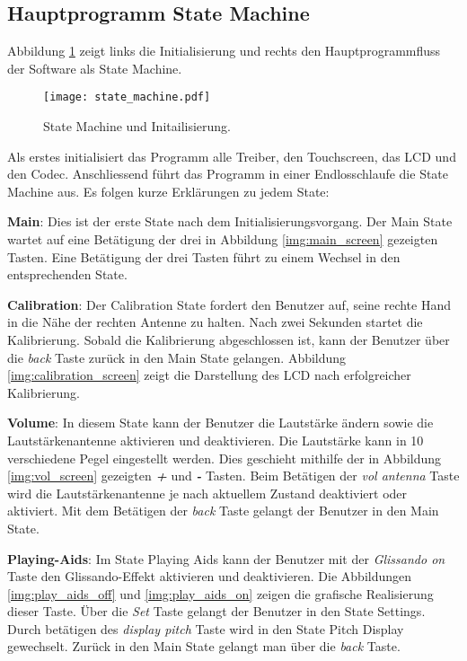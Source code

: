 \subsection{Hauptprogramm State Machine}\label{subsec:State_Machine}
Abbildung \ref{img:state_machine} zeigt links die Initialisierung und rechts den Hauptprogrammfluss der Software als State Machine.
\begin{figure}[h]
	\centering
	\texttt{[image: state\_machine.pdf]}
	\caption{State Machine und Initailisierung.}
	\label{img:state_machine}
\end{figure}

Als erstes initialisiert das Programm alle Treiber, den Touchscreen, das LCD und den Codec. Anschliessend führt das Programm in einer Endlosschlaufe die State Machine aus. Es folgen kurze Erklärungen zu jedem State:

\textbf{Main}:
Dies ist der erste State nach dem Initialisierungsvorgang. Der Main State wartet auf eine Betätigung der drei in Abbildung \ref{img:main_screen} gezeigten Tasten. Eine Betätigung der drei Tasten führt zu einem Wechsel in den entsprechenden State. 
 
\textbf{Calibration}:
Der Calibration State fordert den Benutzer auf, seine rechte Hand in die Nähe der rechten Antenne zu halten.
Nach zwei Sekunden startet die Kalibrierung. Sobald die Kalibrierung abgeschlossen ist, kann der Benutzer über die \textit{back} Taste zurück in den Main State gelangen. Abbildung \ref{img:calibration_screen} zeigt die Darstellung des LCD nach erfolgreicher Kalibrierung.

\textbf{Volume}:
In diesem State kann der Benutzer die Lautstärke ändern sowie die Lautstärkenantenne aktivieren und deaktivieren. Die Lautstärke kann in 10 verschiedene Pegel eingestellt werden. Dies geschieht mithilfe der in Abbildung \ref{img:vol_screen} gezeigten \textbf{\textit{+}} und \textbf{\textit{-}} Tasten. Beim Betätigen der \textit{vol antenna} Taste wird die Lautstärkenantenne je nach aktuellem Zustand deaktiviert oder aktiviert. Mit dem Betätigen der \textit{back} Taste gelangt der Benutzer in den Main State.
 
\textbf{Playing-Aids}:
Im State Playing Aids kann der Benutzer mit der \textit{Glissando on} Taste den Glissando-Effekt aktivieren und deaktivieren. Die Abbildungen \ref{img:play_aids_off} und \ref{img:play_aids_on} zeigen die grafische Realisierung dieser Taste. Über die \textit{Set} Taste gelangt der Benutzer in den State Settings. Durch betätigen des \textit{display pitch} Taste wird in den State Pitch Display gewechselt. Zurück in den Main State gelangt man über die \textit{back} Taste.

